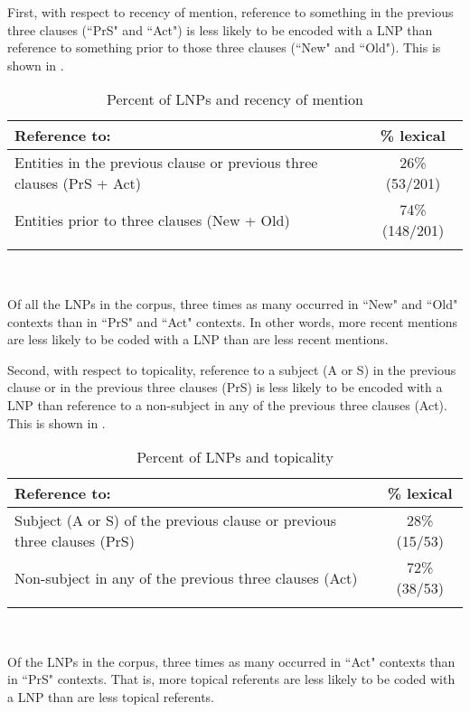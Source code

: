 First, with respect to recency of mention, reference to something in the previous three clauses (``PrS" and ``Act") is less likely to be encoded with a LNP than reference to something prior to those three clauses (``New" and ``Old"). This is shown in .
\begin{table} 

\caption{{Percent of LNPs and recency of mention}}
\begin{tabularx}{\textwidth}{Qc }
\lsptoprule
 Reference to: & {\%} lexical \\

\midrule
Entities in the previous clause or previous three clauses (PrS + Act) & 26{\%} (53/201) \\ 

 
Entities prior to three clauses (New + Old) & 74{\%} (148/201) \\ 

\lspbottomrule 
\end{tabularx}\\
\label{recency}

\end{table}
Of all the LNPs in the corpus, three times as many occurred in ``New" and ``Old" contexts than in ``PrS" and ``Act" contexts. In other words, more recent mentions are less likely to be coded with a LNP than are less recent mentions.

Second, with respect to topicality, reference to a subject (A or S) in the previous clause or in the previous three clauses (PrS) is less likely to be encoded with a LNP than reference to a non-subject in any of the previous three clauses (Act). This is shown in .
\begin{table} 

\caption{{Percent of LNPs and topicality}}
\begin{tabularx}{\textwidth}{Qc }
\midrule
 Reference to: & {\%} lexical \\

\midrule
Subject (A or S) of the previous clause or previous three clauses (PrS) & 28{\%} (15/53)  \\ 

 
Non-subject in any of the previous  three clauses (Act) & 72{\%} (38/53) \\ 

\lspbottomrule
\end{tabularx}\\
\label{topicality}

\end{table}
Of the LNPs in the corpus, three times as many occurred in ``Act" contexts than in  ``PrS" contexts. That is, more topical referents are less likely to be coded with a LNP than are less topical referents. 

